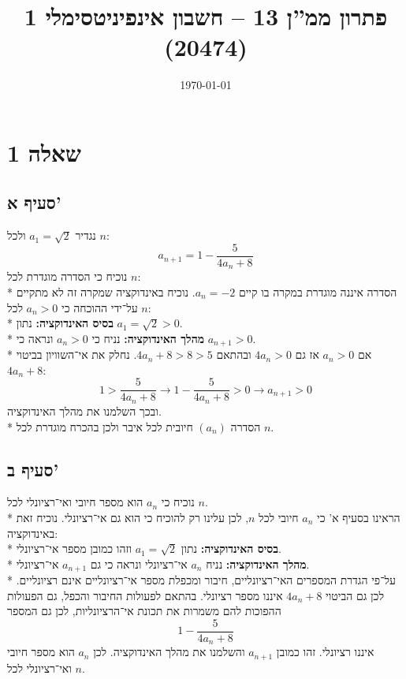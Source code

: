 \documentclass[a4paper]{article}
\title{פתרון ממ''ן 13 – חשבון אינפיניטסימלי 1 (20474)}
\author{\AUTHOR}
\date\today
\begin{document}
\maketitle
\section{שאלה 1}
\subsection{סעיף א'}
נגדיר $a_1 = \sqrt{2}$ ולכל $n$:
\[
	a_{n + 1} = 1 - \frac{5}{4a_n + 8}
\]
נוכיח כי הסדרה מוגדרת לכל $n$: \\*
הסדרה איננה מוגדרת במקרה בו קיים $a_n = -2$.
נוכיח באינדוקציה שמקרה זה לא מתקיים על־ידי ההוכחה כי $a_n > 0$ לכל $n$: \\*
\textbf{בסיס האינדוקציה:} נתון $a_1 = \sqrt{2} > 0$. \\*
\textbf{מהלך האינדוקציה:} נניח כי $a_n > 0$ ונראה כי $a_{n + 1} > 0$. \\*
אם $a_n > 0$ אז גם $4a_n > 0$ ובהתאם $4a_n + 8 > 8 > 5$.
נחלק את אי־השוויון בביטוי $4a_n + 8$:
\[
	1 > \frac{5}{4a_n + 8}
	\rightarrow
	1 - \frac{5}{4a_n + 8} > 0
	\rightarrow
	a_{n + 1} > 0
\]
ובכך השלמנו את מהלך האינדוקציה. \\*
הסדרה $(a_n)$ חיובית לכל איבר ולכן בהכרח מוגדרת לכל $n$.

\subsection{סעיף ב'}
נוכיח כי $a_n$ הוא מספר חיובי ואי־רציונלי לכל $n$. \\*
הראינו בסעיף א' כי $a_n$ חיובי לכל $n$,
לכן עלינו רק להוכיח כי הוא גם אי־רציונלי.
נוכיח זאת באינדוקציה: \\*
\textbf{בסיס האינדוקציה:} נתון $a_1 = \sqrt{2}$ וזהו כמובן מספר אי־רציונלי. \\*
\textbf{מהלך האינדוקציה:} נניח $a_n$ אי־רציונלי
ונראה כי גם $a_{n + 1}$ אי־רציונלי. \\*
על־פי הגדרת המספרים האי־רציונליים,
חיבור ומכפלת מספר אי־רציונליים אינם רציונליים.
לכן גם הביטוי $4a_n + 8$ איננו מספר רציונלי.
בהתאם לפעולות החיבור והכפל,
גם הפעולות ההפוכות להם משמרות את תכונת אי־הרציונליות,
לכן גם המספר
\[
	1 - \frac{5}{4a_n + 8}
\]
איננו רציונלי. זהו כמובן $a_{n + 1}$ והשלמנו את מהלך האינדוקציה.
לכן $a_n$ הוא מספר חיובי ואי־רציונלי לכל $n$.
\end{document}
